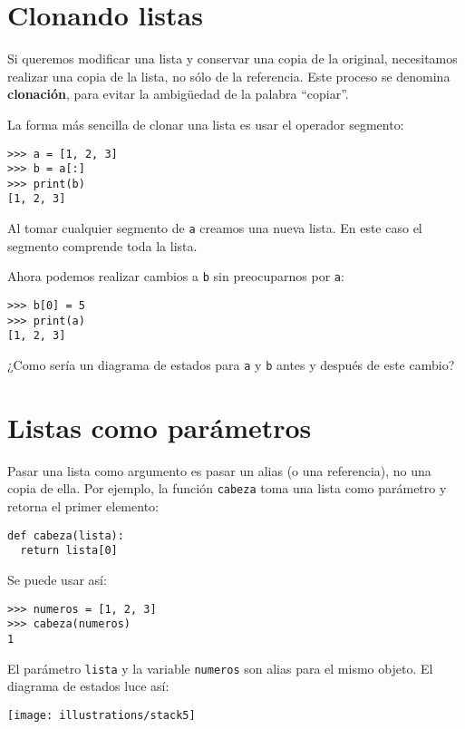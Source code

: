 \section{Clonando listas}

 

Si queremos modificar una lista y conservar una copia de la original,
necesitamos realizar una copia de la lista, no sólo de la referencia.
Este proceso se denomina \textbf{clonación}, para evitar la ambigüedad
de la palabra ``copiar''.

La forma más sencilla de clonar una lista es usar el operador segmento:
\begin{lstlisting}
>>> a = [1, 2, 3]
>>> b = a[:]
>>> print(b)
[1, 2, 3]
\end{lstlisting}

Al tomar cualquier segmento de \texttt{a} creamos una nueva lista.
En este caso el segmento comprende toda la lista.

Ahora podemos realizar cambios a \texttt{b} sin preocuparnos por \texttt{a}:
\begin{lstlisting}
>>> b[0] = 5
>>> print(a)
[1, 2, 3]
\end{lstlisting}

¿Como sería un diagrama de estados para \texttt{a} y \texttt{b} antes
y después de este cambio? 

\section{Listas como parámetros}

  

Pasar una lista como argumento es pasar un alias (o una referencia),
no una copia de ella. Por ejemplo, la función \texttt{cabeza} toma
una lista como parámetro y retorna el primer elemento:
\begin{lstlisting}
def cabeza(lista):
  return lista[0]
\end{lstlisting}

Se puede usar así:
\begin{lstlisting}
>>> numeros = [1, 2, 3]
>>> cabeza(numeros)
1
\end{lstlisting}

El parámetro \texttt{lista} y la variable \texttt{numeros} son alias
para el mismo objeto. El diagrama de estados luce así:

\beforefig \centerline{\texttt{[image: illustrations/stack5]}}
\afterfig

